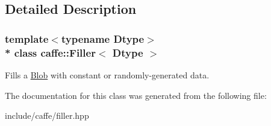 \subsection{Detailed Description}
\subsubsection*{template$<$typename Dtype$>$\\*
class caffe\+::\+Filler$<$ Dtype $>$}

Fills a \hyperlink{classcaffe_1_1Blob}{Blob} with constant or randomly-\/generated data. 

The documentation for this class was generated from the following file\+:\begin{DoxyCompactItemize}
\item 
include/caffe/filler.\+hpp\end{DoxyCompactItemize}
